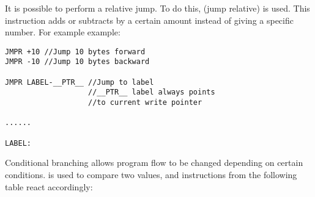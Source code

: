 It is possible to perform a relative jump. To do this,  (jump relative) is used. This instruction adds or subtracts  by a certain amount instead of giving a specific number. For example example:

\begin{verbatim}
JMPR +10 //Jump 10 bytes forward
JMPR -10 //Jump 10 bytes backward

JMPR LABEL-__PTR__ //Jump to label
                   //__PTR__ label always points
                   //to current write pointer

......

LABEL:
\end{verbatim}

Conditional branching allows program flow to be changed depending on certain conditions.  is used to compare two values, and instructions from the following table react accordingly:

